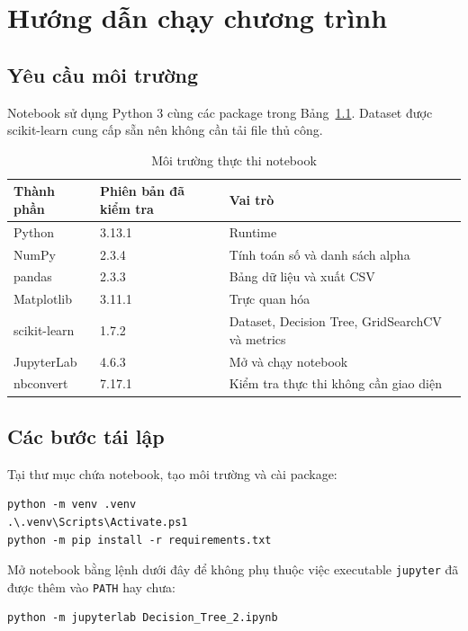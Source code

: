 \chapter{Hướng dẫn chạy chương trình}
\label{chap:instructions}

\section{Yêu cầu môi trường}

Notebook sử dụng Python 3 cùng các package trong Bảng~\ref{tab:environment}.
Dataset được scikit-learn cung cấp sẵn nên không cần tải file thủ công.

\begin{table}[H]
\centering
\caption{Môi trường thực thi notebook}
\label{tab:environment}
\begin{tabular}{lll}
\toprule
Thành phần & Phiên bản đã kiểm tra & Vai trò \\
\midrule
Python & 3.13.1 & Runtime \\
NumPy & 2.3.4 & Tính toán số và danh sách alpha \\
pandas & 2.3.3 & Bảng dữ liệu và xuất CSV \\
Matplotlib & 3.11.1 & Trực quan hóa \\
scikit-learn & 1.7.2 & Dataset, Decision Tree, GridSearchCV và metrics \\
JupyterLab & 4.6.3 & Mở và chạy notebook \\
nbconvert & 7.17.1 & Kiểm tra thực thi không cần giao diện \\
\bottomrule
\end{tabular}
\end{table}

\section{Các bước tái lập}

Tại thư mục chứa notebook, tạo môi trường và cài package:

\begin{verbatim}
python -m venv .venv
.\.venv\Scripts\Activate.ps1
python -m pip install -r requirements.txt
\end{verbatim}

Mở notebook bằng lệnh dưới đây để không phụ thuộc việc executable
\texttt{jupyter} đã được thêm vào \texttt{PATH} hay chưa:

\begin{verbatim}
python -m jupyterlab Decision_Tree_2.ipynb
\end{verbatim}

